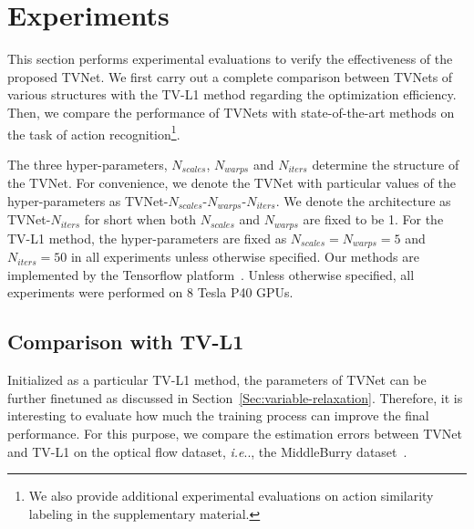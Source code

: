\documentclass[10pt,twocolumn,letterpaper]{article}
\makeatletter
\DeclareRobustCommand\onedot{\futurelet\@let@token\@onedot}
\def\@onedot{\ifx\@let@token.\else.\null\fi\xspace}
\def\ie{\emph{i.e}\onedot} \def\Ie{\emph{I.e}\onedot}
\makeatother
\begin{document}
 \section{Experiments}

This section performs experimental evaluations to verify the effectiveness of the proposed TVNet. We first carry out a complete comparison between TVNets of various structures with the TV-L1 method regarding the optimization efficiency.
Then, we compare the performance of TVNets with state-of-the-art methods on the task of action recognition\footnote{We also provide additional experimental evaluations on action similarity labeling in the supplementary material.}. 

The three hyper-parameters, $N_{scales}$, $N_{warps}$ and $N_{iters}$ determine the structure of the TVNet.
For convenience, we denote the TVNet with particular values of the hyper-parameters as TVNet-$N_{scales}$-$N_{warps}$-$N_{iters}$. We denote the architecture as TVNet-$N_{iters}$ for short when both $N_{scales}$ and $N_{warps}$ are fixed to be 1.
For the TV-L1 method, the hyper-parameters are fixed as $N_{scales}=N_{warps}=5$ and $N_{iters}=50$ in all experiments unless otherwise specified.
Our methods are implemented by the Tensorflow platform~\cite{abadi2016tensorflow}. Unless otherwise specified, all experiments were performed on 8 Tesla P40 GPUs.


\subsection{Comparison with TV-L1}

Initialized as a particular TV-L1 method, the parameters of TVNet can be further finetuned as discussed in Section~\ref{Sec:variable-relaxation}. Therefore, it is interesting to evaluate how much the training process can improve the final performance. For this purpose, we compare the estimation errors between TVNet and TV-L1 on the optical flow dataset, \ie, the MiddleBurry dataset~\cite{baker2011database}.
\end{document}
